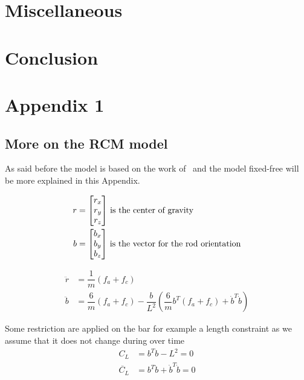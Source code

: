 \documentclass[twoside,12pt]{report} %
\begin{document}
\chapter{Miscellaneous}


\chapter*{Conclusion}

{
\printglossaries
{}
}
\chapter*{Appendix 1}
\section*{More on the RCM model}

As said before the model is based on the work of~\cite{johansen2007modelling} and the model fixed-free will be more explained in this Appendix.

\begin{align}
r &= \begin{bmatrix}
    r_x \\
    r_y \\
    r_z
\end{bmatrix}\, \textnormal{is the center of gravity}\\
b &= \begin{bmatrix}
    b_x \\
    b_y \\
    b_z
\end{bmatrix}\, \textnormal{is the vector for the rod orientation} 
\end{align}


\begin{align}
\ddot{r} &= \dfrac{1}{m}  (f_a+f_c) \nonumber\\
\ddot{b} &=  \dfrac{6}{m}(f_a+f_c) - \dfrac{b}{L^{2}}  (\dfrac{6}{m}b^{T}(f_a+f_c)+\dot{b}^{T}\dot{b}) 
\end{align}

Some restriction are applied on the bar for example a length constraint as we assume that it does not change during over time
\begin{align}
C_L &= b^T b-L^2=0 \\
\ddot{C_L} &= b^T \ddot{b}+\dot{b}^T \dot{b}=0 \\
\end{align}
\end{document}
